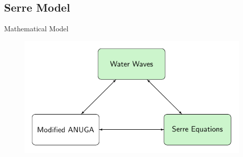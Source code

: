 \documentclass[]{beamer}
\begin{document}
\subsection{Serre Model}
\begin{frame}{Mathematical Model}
	\begin{figure}
		\includegraphics[width=\textwidth]{./Pics/ModelDiagrams/FlowChartSerre12G.pdf}
	\end{figure}
\end{frame}
\end{document}
